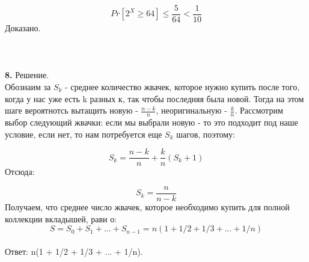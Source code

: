 \documentclass[12pt,a4paper]{scrartcl}
\begin{document}
$$
Pr[2^{X} \geq 64] \leq \frac{5}{64} < \frac{1}{10}
$$
Доказано.
\\ \\ \\ \\



\noindent \textbf{8.}
Решение.\\
Обознаим за $S_k$ - среднее количество жвачек, которое нужно купить после того, когда у нас уже есть k разных к, так чтобы последняя была новой. Тогда на этом шаге вероятнотсь вытащить новую - $\frac{n-k}{n}$, неоригинальную - $\frac{k}{n}$. Рассмотрим выбор следующий жвачки: если мы выбрали новую - то это подходит под наше условие, если нет, то нам потребуется еще  $S_k$ шагов, поэтому: 

$$
S_k 
= \frac{n-k}{n} + \frac{k}{n} (S_k + 1)
$$
Отсюда:

$$
S_k 
= \frac{n}{n - k}
$$
Получаем, что среднее число жвачек, которое необходимо купить для полной коллекции вкладышей, равн
о:
$$
S 
= S_0 + S_1 + ... + S_{n-1} = n(1 + 1/2 + 1/3 + ... + 1/n)
$$
\\Ответ: n(1 + 1/2 + 1/3 + ... + 1/n).
\\ \\ \\ \\
\end{document}
